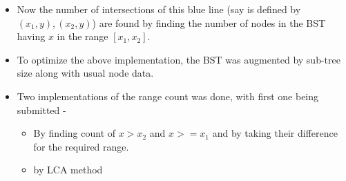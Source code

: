\documentclass{article}
\begin{document}
\begin{itemize}
\item Now the number of intersections of this blue line (say is defined by $(x_1,y),(x_2,y)$)  are found by finding the number of nodes in the BST having $x$ in the range $[x_1,x_2]$.
\item To optimize the above implementation, the BST was augmented by sub-tree size along with usual node data.
\item Two implementations of the range count was done, with first one being submitted -
\begin{itemize}
\item By finding count of $x > x_2$ and $x >= x_1$ and by taking their difference for the required range. 
\item by LCA method
\end{itemize} 
\end{itemize}
\end{document}
